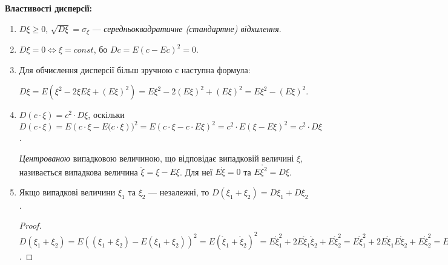 \noindent \textbf{Властивості дисперсії:}
\begin{enumerate}
    \item $D\xi \geq 0$, $\sqrt{D\xi} = \sigma_\xi$ --- \emph{середньоквадратичне (стандартне) відхилення}.
    \item $D\xi = 0 \Leftrightarrow \xi = const$, бо $D c = E(c - Ec)^2 = 0$.
    \item Для обчислення дисперсії більш зручною є наступна формула:

    $D\xi = E(\xi^2 - 2\xi E\xi +(E\xi)^2) = E\xi^2 - 2(E\xi)^2 + (E\xi)^2 = E\xi^2 - (E\xi)^2$. 
    \item $D(c\cdot \xi) = c^2\cdot D\xi$, оскільки $D(c\cdot \xi) = E\left(c\cdot\xi-E(c\cdot\xi\right))^2 = E\left(c\cdot\xi - c\cdot E\xi\right)^2 = c^2 \cdot E\left(\xi-E\xi\right)^2 = c^2 \cdot D\xi$.
\begin{definition}
    \emph{Центрованою} випадковою величиною, що відповідає випадковій величині $\xi$, називається 
    випадкова величина $\mathring{\xi} = \xi - E\xi$. Для неї $E\mathring{\xi} = 0$ та 
    $E\mathring{\xi^2} = D\xi$.
\end{definition}
    \item Якщо випадкові величини $\xi_1$ та $\xi_2$ --- незалежні, то
    $D\left(\xi_1 + \xi_2\right) = D\xi_1 + D\xi_2$.
    \begin{proof}
        $D\left(\xi_1 + \xi_2\right) = E((\xi_1 + \xi_2) - E(\xi_1 + \xi_2))^2 = E(\mathring{\xi}_1 + \mathring{\xi}_2)^2 =
        E\mathring{\xi}_1^2 + 2E\mathring{\xi}_1\mathring{\xi}_2 + E\mathring{\xi}_2^2 = 
        E\mathring{\xi}_1^2 + 2E\mathring{\xi}_1 E\mathring{\xi}_2 + E\mathring{\xi}_2^2 =
        E\mathring{\xi}_1^2 + E\mathring{\xi}_2^2 = D\xi_1 + D\xi_2$.
    \end{proof}
\end{enumerate}

